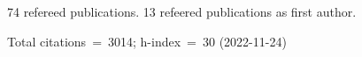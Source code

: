 74 refereed publications. 13 refeered publications as first author.

Total citations~=~3014; h-index~=~30 (2022-11-24)